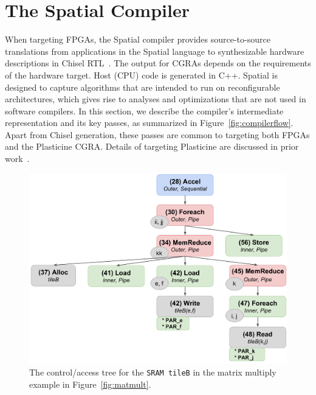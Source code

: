 \section{The Spatial Compiler}
\label{compiler}

When targeting FPGAs, the Spatial compiler provides source-to-source translations from applications in the Spatial language to synthesizable hardware descriptions in Chisel RTL~\cite{chisel}.
The output for CGRAs depends on the requirements of the hardware target. Host (CPU) code is generated in C++.
Spatial is designed to capture algorithms that are intended to run on reconfigurable architectures,
which gives rise to analyses and optimizations that are not used in software compilers.
In this section, we describe the compiler's intermediate representation and its key passes, as summarized in Figure~\ref{fig:compilerflow}.
Apart from Chisel generation, these passes are common to targeting both FPGAs and the Plasticine CGRA. Details of targeting Plasticine are discussed in prior work~\cite{plasticine}.

\begin{figure}
\includegraphics[clip, width=0.9\columnwidth]{figs/control_tree_gemm.pdf}
\vspace{-10pt}
\caption{The control/access tree for the \texttt{\small{SRAM tileB}} in the matrix multiply example in Figure~\ref{fig:matmult}.
\vspace{-5pt}
}
\label{fig:controlTree}
\end{figure}

